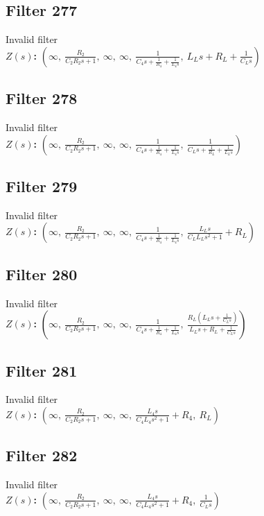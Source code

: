 \documentclass{article}
\begin{document}
\subsection*{Filter 277}
Invalid filter \\ 
\textbf{$Z(s)$:} $\left( \infty, \  \frac{R_{2}}{C_{2} R_{2} s + 1}, \  \infty, \  \infty, \  \frac{1}{C_{4} s + \frac{1}{R_{4}} + \frac{1}{L_{4} s}}, \  L_{L} s + R_{L} + \frac{1}{C_{L} s}\right)$ \\ 
\subsection*{Filter 278}
Invalid filter \\ 
\textbf{$Z(s)$:} $\left( \infty, \  \frac{R_{2}}{C_{2} R_{2} s + 1}, \  \infty, \  \infty, \  \frac{1}{C_{4} s + \frac{1}{R_{4}} + \frac{1}{L_{4} s}}, \  \frac{1}{C_{L} s + \frac{1}{R_{L}} + \frac{1}{L_{L} s}}\right)$ \\ 
\subsection*{Filter 279}
Invalid filter \\ 
\textbf{$Z(s)$:} $\left( \infty, \  \frac{R_{2}}{C_{2} R_{2} s + 1}, \  \infty, \  \infty, \  \frac{1}{C_{4} s + \frac{1}{R_{4}} + \frac{1}{L_{4} s}}, \  \frac{L_{L} s}{C_{L} L_{L} s^{2} + 1} + R_{L}\right)$ \\ 
\subsection*{Filter 280}
Invalid filter \\ 
\textbf{$Z(s)$:} $\left( \infty, \  \frac{R_{2}}{C_{2} R_{2} s + 1}, \  \infty, \  \infty, \  \frac{1}{C_{4} s + \frac{1}{R_{4}} + \frac{1}{L_{4} s}}, \  \frac{R_{L} \left(L_{L} s + \frac{1}{C_{L} s}\right)}{L_{L} s + R_{L} + \frac{1}{C_{L} s}}\right)$ \\ 
\subsection*{Filter 281}
Invalid filter \\ 
\textbf{$Z(s)$:} $\left( \infty, \  \frac{R_{2}}{C_{2} R_{2} s + 1}, \  \infty, \  \infty, \  \frac{L_{4} s}{C_{4} L_{4} s^{2} + 1} + R_{4}, \  R_{L}\right)$ \\ 
\subsection*{Filter 282}
Invalid filter \\ 
\textbf{$Z(s)$:} $\left( \infty, \  \frac{R_{2}}{C_{2} R_{2} s + 1}, \  \infty, \  \infty, \  \frac{L_{4} s}{C_{4} L_{4} s^{2} + 1} + R_{4}, \  \frac{1}{C_{L} s}\right)$ \\ 
\end{document}
